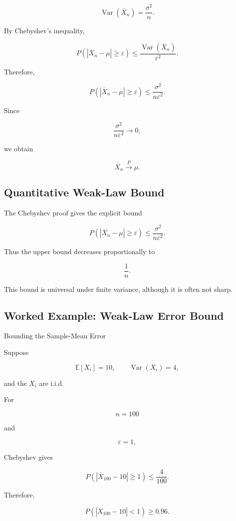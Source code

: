 \[
\operatorname{Var}(\overline{X}_n)
=
\frac{\sigma^2}{n}.
\]

By Chebyshev's inequality,

\[
P
\left(
|\overline{X}_n-\mu|
\geq
\varepsilon
\right)
\leq
\frac{
\operatorname{Var}(\overline{X}_n)
}{
\varepsilon^2
}.
\]

Therefore,

\[
P
\left(
|\overline{X}_n-\mu|
\geq
\varepsilon
\right)
\leq
\frac{
\sigma^2
}{
n\varepsilon^2
}.
\]

Since

\[
\frac{
\sigma^2
}{
n\varepsilon^2
}
\to0,
\]

we obtain

\[
\boxed{
\overline{X}_n
\xrightarrow{P}
\mu.
}
\]

\subsection{Quantitative Weak-Law Bound}
\label{subsec:quantitative-weak-law}

The Chebyshev proof gives the explicit bound

\[
\boxed{
P
\left(
|\overline{X}_n-\mu|
\geq
\varepsilon
\right)
\leq
\frac{
\sigma^2
}{
n\varepsilon^2
}.
}
\]

Thus the upper bound decreases proportionally to

\[
\frac1n.
\]

This bound is universal under finite variance, although it is often not
sharp.

\subsection{Worked Example: Weak-Law Error Bound}
\label{subsec:worked-weak-law-bound}

\begin{workedexamplebox}{Bounding the Sample-Mean Error}

Suppose

\[
\mathbb{E}[X_i]=10,
\qquad
\operatorname{Var}(X_i)=4,
\]

and the \(X_i\) are i.i.d.

For

\[
n=100
\]

and

\[
\varepsilon=1,
\]

Chebyshev gives

\[
P
\left(
|\overline{X}_{100}-10|
\geq1
\right)
\leq
\frac4{100}.
\]

Therefore,

\begin{answerbox}
\[
\boxed{
P
\left(
|\overline{X}_{100}-10|
<1
\right)
\geq
0.96.
}
\]
\end{answerbox}

\end{workedexamplebox}

